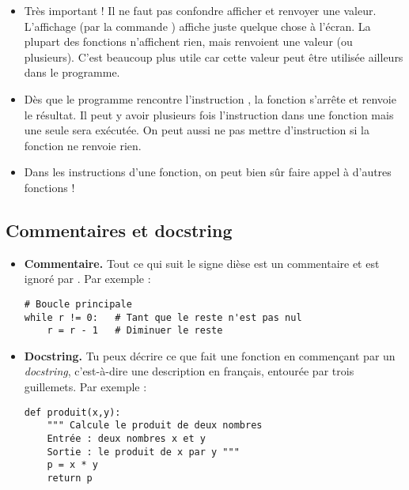 \documentclass[11pt,class=report,crop=false]{standalone}
\begin{document}
\begin{itemize}
  \item Très important ! Il ne faut pas confondre afficher et renvoyer une valeur.
  L'affichage (par la commande ) affiche juste quelque chose à l'écran. La plupart des fonctions n'affichent rien, mais renvoient une valeur (ou plusieurs). C'est beaucoup plus utile car cette valeur peut être utilisée ailleurs dans le programme.

  
  \item Dès que le programme rencontre l'instruction , la fonction s'arrête et renvoie le résultat. Il peut y avoir plusieurs fois l'instruction  dans une fonction mais une seule sera exécutée. On peut aussi ne pas mettre d'instruction  si la fonction ne renvoie rien.
  
  \item Dans les instructions d'une fonction, on peut bien sûr faire appel à d'autres fonctions !
   
\end{itemize}

\subsection{Commentaires et docstring}

\begin{itemize}
  \item \textbf{Commentaire.} Tout ce qui suit le signe dièse \ci{#} est un commentaire et est ignoré par \Python. 
  Par exemple :
\begin{lstlisting}
# Boucle principale
while r != 0:   # Tant que le reste n'est pas nul
    r = r - 1   # Diminuer le reste
\end{lstlisting}
  
  \item \textbf{Docstring.} Tu peux décrire ce que fait une fonction en commençant par un \emph{docstring}, c'est-à-dire une description     
en français, entourée par trois guillemets.  
 Par exemple :
\begin{lstlisting}
def produit(x,y):
    """ Calcule le produit de deux nombres
    Entrée : deux nombres x et y
    Sortie : le produit de x par y """
    p = x * y
    return p 
\end{lstlisting} 

\end{itemize}
\end{document}
